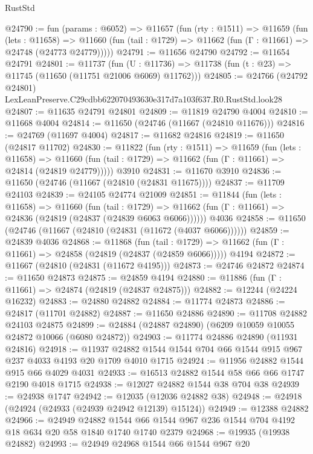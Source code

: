 \begin{lexlean}{RustStd}
\begin{coremodule}
@24790 := fun (params : @6052) =>
  @11657
    (fun (rty : @1511) =>
    @11659
      (fun (lets : @11658) =>
      @11660 (fun (tail : @1729) => @11662 (fun (Γ : @11661) => @24748 (@24773 @24779)))))
@24791 := @11656 @24790
@24792 := @11654 @24791
@24801 := @11737
    (fun (U : @11736) => @11738 (fun (t : @23) => @11745 (@11650 (@11751 @21006 @6069) @11762)))
@24805 := @24766 (@24792 @24801) LexLeanPreserve.C29cdbb622070493630e317d7a103f637.R0.RustStd.look28
@24807 := @11635 @24791 @24801
@24809 := @11819 @24790 @4004
@24810 := @11668 @4004
@24814 := @11650 (@24746 (@11667 (@24810 @11676)))
@24816 := @24769 (@11697 @4004)
@24817 := @11682 @24816
@24819 := @11650 (@24817 @11702)
@24830 := @11822
    (fun (rty : @1511) =>
    @11659
      (fun (lets : @11658) =>
      @11660 (fun (tail : @1729) => @11662 (fun (Γ : @11661) => @24814 (@24819 @24779)))))
    @3910
@24831 := @11670 @3910
@24836 := @11650 (@24746 (@11667 (@24810 (@24831 @11675))))
@24837 := @11709 @24103
@24839 := @24105 @24774 @21009
@24851 := @11844
    (fun (lets : @11658) =>
    @11660
      (fun (tail : @1729) =>
      @11662 (fun (Γ : @11661) => @24836 (@24819 (@24837 (@24839 @6063 @6066))))))
    @4036
@24858 := @11650 (@24746 (@11667 (@24810 (@24831 (@11672 (@4037 @6066))))))
@24859 := @24839 @4036
@24868 := @11868
    (fun (tail : @1729) => @11662 (fun (Γ : @11661) => @24858 (@24819 (@24837 (@24859 @6066)))))
    @4194
@24872 := @11667 (@24810 (@24831 (@11672 @4195)))
@24873 := @24746 @24872
@24874 := @11650 @24873
@24875 := @24859 @4194
@24880 := @11886 (fun (Γ : @11661) => @24874 (@24819 (@24837 @24875)))
@24882 := @12244 (@24224 @16232)
@24883 := @24880 @24882
@24884 := @11774 @24873
@24886 := @24817 (@11701 @24882)
@24887 := @11650 @24886
@24890 := @11708 @24882 @24103 @24875
@24899 := @24884 (@24887 @24890) (@6209 @10059 @10055 @24872 @10066 (@6080 @24872))
@24903 := @11774 @24886 @24890 (@11931 @24816)
@24918 := @11937 @24882 @1544 @1544 @704 @66 @1544 @915 @967 @237 @4033 @4193 @20 @1709 @4010 @1715
@24924 := @11956 @24882 @1544 @915 @66 @4029 @4031
@24933 := @16513 @24882 @1544 @58 @66 @66 @1747 @2190 @4018 @1715
@24938 := @12027 @24882 @1544 @38 @704 @38
@24939 := @24938 @1747
@24942 := @12035 (@12036 @24882 @38)
@24948 := @24918 (@24924 (@24933 (@24939 @24942 @12139) @15124))
@24949 := @12388 @24882
@24966 := @24949
    @24882
    @1544
    @66
    @1544
    @967
    @236
    @1544
    @704
    @4192
    @18
    @634
    @20
    @58
    @1840
    @1740
    @1740
    @2379
@24968 := @19935 (@19938 @24882)
@24993 := @24949
    @24968
    @1544
    @66
    @1544
    @967
    @20

\end{coremodule}
\end{lexlean}
